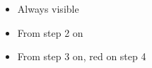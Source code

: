 \begin{itemize}
	\item Always visible
	\item<2-> From step 2 on
	\item<3-> From step 3 on, \textcolor<4>{c_custom_red}{red} on step 4
\end{itemize}
\pause %
